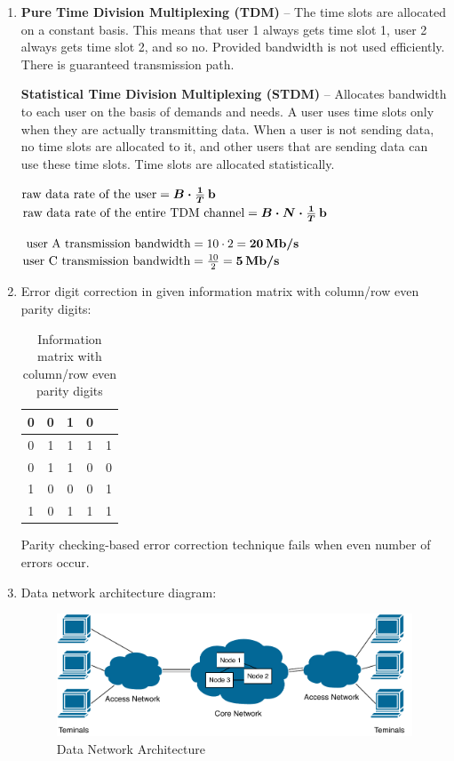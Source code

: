 \documentclass[a4paper, 11pt]{article}
\begin{document}
	\begin{enumerate}
		\item %
			\textbf{Pure Time Division Multiplexing (TDM)} -- The time slots are allocated on a constant basis.
			This means that user 1 always gets time slot 1, user 2 always gets time slot 2, and so no.
			Provided bandwidth is not used efficiently. There is guaranteed transmission path.

			\textbf{Statistical Time Division Multiplexing (STDM)} -- Allocates bandwidth to each user on the basis
			of demands and needs. A user uses time slots only when they are actually transmitting data.
			When a user is not sending data, no time slots are allocated to it, and other users that
			are sending data can use these time slots. Time slots are allocated statistically.

			$ \text{raw data rate of the user} = \boldsymbol{B \cdot \frac{1}{T}\,\text{\textbf{b}}} $ \\
			$
				\text{raw data rate of the entire TDM channel}
				= \boldsymbol{B \cdot N \cdot \frac{1}{T}\,\text{\textbf{b}}}
			$

			$ \text{user A transmission bandwidth} = 10 \cdot 2 = \boldsymbol{20\,\text{\textbf{Mb/s}}} $ \\
			$ \text{user C transmission bandwidth} = \frac{10}{2} = \boldsymbol{5\,\text{\textbf{Mb/s}}} $

		\item %
			Error digit correction in given information matrix with column/row even parity digits:
			\begin{table}[H]
				\centering
				\begin{tabular}{c c c c | c}
					0 & 0 & 1 & 0 & \\ \hline
					0 & {\color{red} 1} & 1 & 1 & 1 \\
					0 & 1 & 1 & 0 & 0 \\
					1 & 0 & 0 & 0 & 1 \\
					1 & 0 & 1 & 1 & 1 \\
				\end{tabular}
				\caption{Information matrix with column/row even parity digits}
				\label{table:information_parity_matrix}
			\end{table}

			Parity checking-based error correction technique fails when even number of errors occur.

		\item %
			Data network architecture diagram:
			\begin{figure}[H]
				\centering
				\includegraphics[width=0.7\linewidth]{inc/data_network_architecture.pdf}
				\caption{Data Network Architecture}
				\label{figure:data_network_architecture}
			\end{figure}


\end{enumerate}
\end{document}
